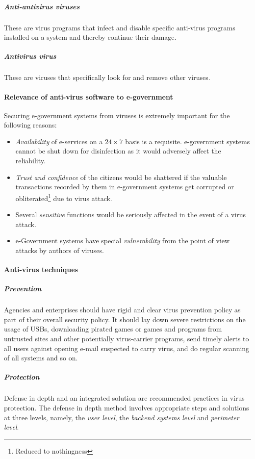 \subparagraph*{Anti-antivirus viruses}
These are virus programs that infect and disable specific
anti-virus programs installed on a system and thereby continue their damage.

 \subparagraph*{Antivirus virus}
 These are viruses that specifically look for and remove other viruses.
 
 
\paragraph*{Relevance of anti-virus software to e-government}
Securing e-government systems from viruses is extremely important for the following
reasons:
 \begin{itemize}
 	\item \textit{Availability} of e-services on a $ 24 \times 7 $ basis is a requisite. e-government systems 
 	cannot be shut down for disinfection as it would adversely affect the reliability.
 	\item \textit{Trust and confidence} of the citizens would be shattered if the valuable
 	transactions recorded by them in e-government systems get corrupted or obliterated\footnote{Reduced to nothingness} due to virus attack.
 	\item Several \textit{sensitive} functions would be seriously affected in the event of a virus
 	attack.
 	\item e-Government systems have special \textit{vulnerability} from the point of view attacks by authors of viruses.
 \end{itemize}

\paragraph*{Anti-virus techniques}

\subparagraph*{Prevention}
 Agencies and enterprises should have rigid and clear virus prevention policy as part of their overall security policy. It should lay down severe restrictions on the usage of USBs, downloading pirated games or games and programs from untrusted sites and other potentially virus-carrier programs, send timely alerts to all users against opening e-mail suspected to carry virus, and do regular scanning of all systems and so on.


 \subparagraph*{Protection} 
Defense in depth and an integrated
solution are recommended practices in virus protection. The defense in depth method involves appropriate steps and solutions at three levels, namely, the \textit{user level}, the \textit{backend systems level} and \textit{perimeter level}. 

